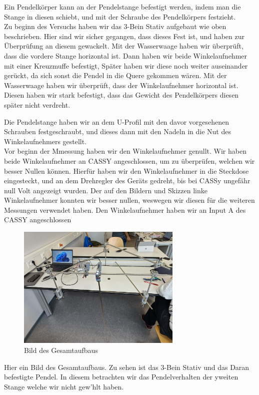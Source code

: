 \documentclass[twoside]{protokoll}
\begin{document}
Ein Pendelkörper kann an der Pendelstange befestigt werden, indem man die Stange in diesen schiebt, und mit der Schraube des Pendelkörpers festzieht.\\

Zu beginn des Versuchs haben wir das 3-Bein Stativ aufgebaut wie oben beschrieben. 
Hier sind wir sicher gegangen, dass dieses Fest ist, und haben zur Überprüfung an diesem gewackelt.
Mit der Wasserwaage haben wir überprüft, dass die vordere Stange horizontal ist. 
Dann haben wir beide Winkelaufnehmer mit einer Kreuzmuffe befestigt, Später haben wir diese noch weiter auseinander gerückt, da sich sonst die Pendel in die Quere gekommen wären. 
Mit der Wasserwaage haben wir überprüft, dass der Winkelaufnehmer horizontal ist. 
Diesen haben wir stark befestigt, dass das Gewicht des Pendelkörpers diesen später nicht verdreht.
 
Die Pendelstange haben wir an dem U-Profil mit den davor vorgesehenen Schrauben festgeschraubt, und dieses dann mit den Nadeln in die Nut des Winkelaufnehmers gestellt.\\
Vor beginn der Mmessung haben wir den Winkelaufnehmer genullt. 
Wir haben beide Winkelaufnehmer an CASSY angeschlossen, um zu überprüfen, welchen wir besser Nullen können.
Hierfür haben wir den Winkelaufnehmer in die Steckdose eingesteckt, und an dem Drehregler des Geräts gedreht, bis bei CASSy ungefähr null Volt angezeigt wurden.
Der auf den Bildern und Skizzen linke Winkelaufnehmer konnten wir besser nullen, weswegen wir diesen für die weiteren Messungen verwendet haben.
Den Winkelaufnehmer haben wir an Input A des CASSY angeschlossen\\
\begin{figure}[H]
    \centering
    \includegraphics[width=0.7\textwidth]{Bilder/gesamtaufbau.pdf}
    \caption{Bild des Gesamtaufbaus}
    \end{figure}
Hier ein Bild des Gesamtaufbaus. Zu sehen ist das 3-Bein Stativ und das Daran befestigte Pendel.
In diesem betrachten wir das Pendelverhalten der yweiten Stange welche wir nicht gew'hlt haben.\\
\end{document}
